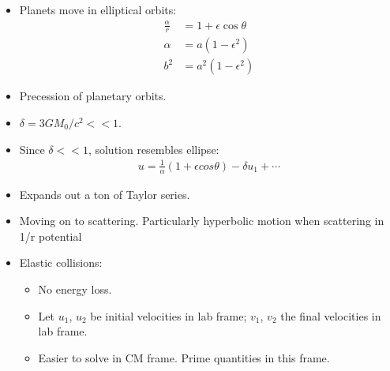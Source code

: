 \documentclass[10pt, twocolumn]{article}
\begin{document}
\subsection{}
\begin{itemize}
	\item Planets move in elliptical orbits:
	\begin{align}
		\frac{\alpha}{r} &= 1 + \epsilon \cos\theta \\
		\alpha &= a(1-\epsilon^2) \\
		b^2 &= a^2(1-\epsilon^2)
	\end{align}
	\item Precession of planetary orbits. 
	\item $\delta = 3GM_0 / c^2 << 1$. 
	\item Since $\delta << 1$, solution resembles ellipse:
	\begin{align}
		u = \frac{1}{\alpha}(1 + \epsilon cos\theta) - \delta u_1 + \cdots 
	\end{align}
	\item Expands out a ton of Taylor series. 
	\item Moving on to scattering. Particularly hyperbolic motion when scattering in 1/r potential 
	\item Elastic collisions: 
	\begin{itemize}
		\item No energy loss. 
		\item Let $u_1$, $u_2$ be initial velocities in lab frame; $v_1$, $v_2$ the final velocities in lab frame. 
		\item Easier to solve in CM frame. Prime quantities in this frame. 
	\end{itemize}
\end{itemize}
\end{document}
